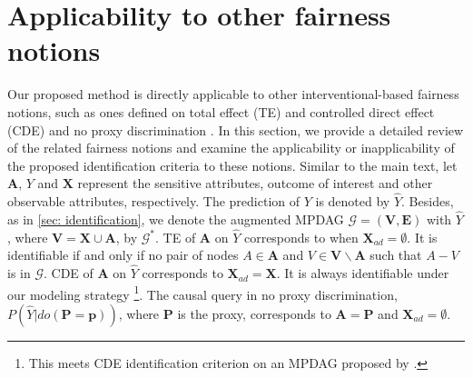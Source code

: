 \documentclass{article} %
\begin{document}
\section{Applicability to other fairness notions} \label{appendix: Applicability}
Our proposed method is directly applicable to other interventional-based fairness notions, such as ones defined on total effect (TE) and controlled direct effect (CDE) \citep{pearl2009causality} and no proxy discrimination \citep{kilbertus2017avoiding}.
In this section, we provide a detailed review of the related fairness notions and examine the applicability or inapplicability of the proposed identification criteria to these notions. Similar to the main text, let $\mathbf{A}$, $Y$ and $\mathbf{X}$ represent the sensitive attributes, outcome of interest and other observable attributes, respectively. The prediction of $Y$ is denoted by $\hat{Y}$. Besides, as in \cref{sec: identification}, we denote the augmented MPDAG $\mathcal{G}=(\mathbf{V}, \mathbf{E})$ with $\hat{Y}$, where $\mathbf{V}=\mathbf{X} \cup \mathbf{A}$, by $\mathcal{G^{*}}$. TE of $\mathbf{A}$ on $\hat{Y}$ corresponds to when $\mathbf{X}_{ad}=\emptyset$. It is identifiable if and only if no pair of nodes $A \in \mathbf{A}$ and $V \in \mathbf{V} \backslash \mathbf{A}$ such that $A - V$ is in $\mathcal{G}$. CDE of $\mathbf{A}$ on $\hat{Y}$ corresponds to $\mathbf{X}_{ad}=\mathbf{X}$. It is always identifiable under our modeling strategy \footnote{This meets CDE identification criterion on an MPDAG proposed by \citet[Theorem 5.4]{flanagan2020identification}.}. 
The causal query in no proxy discrimination, $P(\hat{Y}|do(\mathbf{P}=\mathbf{p}))$, where $\mathbf{P}$ is the proxy, corresponds to $\mathbf{A}=\mathbf{P}$ and $\mathbf{X}_{ad}=\emptyset$.
\end{document}
